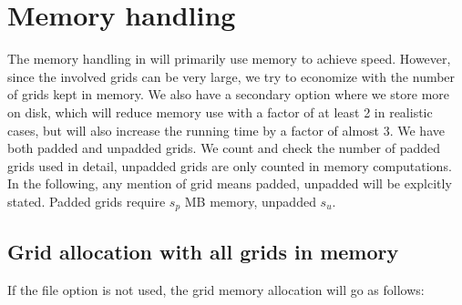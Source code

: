 \section{Memory handling}
The memory handling in \crava will primarily use memory to achieve speed. However, since the involved grids can be very large, we try to economize with the number of grids kept in memory. We also have a secondary option where we store more on disk, which will reduce memory use with a factor of at least 2 in realistic cases, but will also increase the running time by a factor of almost 3. We have both padded and unpadded grids. We count and check the number of padded grids used in detail, unpadded grids are only counted in memory computations. In the following, any mention of grid means padded, unpadded will be explcitly stated. Padded grids require $s_p$ MB memory, unpadded $s_u$.

\subsection{Grid allocation with all grids in memory}
 If the file option is not used, the grid memory allocation will go as follows:

